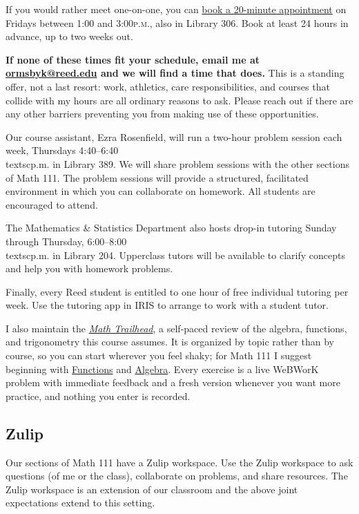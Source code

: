 \documentclass[11pt,twoside]{amsart}
\begin{document}
If you would rather meet one-on-one, you can \href{https://calendar.app.google/xUQmAFHKmqt44Q7R8}{book a 20-minute appointment} on Fridays between 1:00 and 3:00\textsc{p.m.}, also in Library 306.  Book at least 24 hours in advance, up to two weeks out.

\textbf{If none of these times fit your schedule, email me at \href{mailto:ormsbyk@reed.edu}{ormsbyk@reed.edu} and we will find a time that does.}  This is a standing offer, not a last resort: work, athletics, care responsibilities, and courses that collide with my hours are all ordinary reasons to ask.  Please reach out if there are any other barriers preventing you from making use of these opportunities.

Our course assistant, Ezra Rosenfield, will run a two-hour problem session each week, Thursdays 4:40--6:40\\textsc{p.m.} in Library 389.  We will share problem sessions with the other sections of Math 111.  The problem sessions will provide a structured, facilitated environment in which you can collaborate on homework.  All students are encouraged to attend.

The Mathematics \& Statistics Department also hosts drop-in tutoring Sunday through Thursday, 6:00--8:00\\textsc{p.m.} in Library 204. Upperclass tutors will be available to clarify concepts and help you with homework problems.

Finally, every Reed student is entitled to one hour of free individual tutoring per week.  Use the tutoring app in IRIS to arrange to work with a student tutor.

I also maintain the \href{https://e-infinity.space/math-th/}{\emph{Math Trailhead}}, a
self-paced review of the algebra, functions, and trigonometry this course
assumes. It is organized by topic rather than by course, so you can start
wherever you feel shaky; for Math 111 I suggest beginning with
\href{https://e-infinity.space/math-th/functions.html}{Functions} and
\href{https://e-infinity.space/math-th/algebra.html}{Algebra}. Every exercise is
a live WeBWorK problem with immediate feedback and a fresh version whenever you
want more practice, and nothing you enter is recorded.

\subsection*{Zulip}
Our sections of Math 111 have a Zulip workspace.  Use the Zulip workspace to ask questions (of me or the class), collaborate on problems, and share resources. The Zulip workspace is an extension of our classroom and the above joint expectations extend to this setting.
\end{document}
